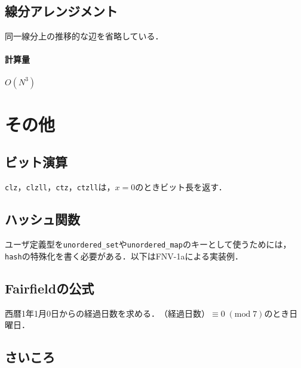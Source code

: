 \documentclass[landscape,twocolumn,9pt]{jsarticle}
\begin{document}
\subsection{線分アレンジメント}
同一線分上の推移的な辺を省略している．
\paragraph{計算量} $O(N^3)$


\section{その他}%
\subsection{ビット演算}
\texttt{clz}，\texttt{clzll}，\texttt{ctz}，\texttt{ctzll}は，$x=0$のときビット長を返す．


\subsection{ハッシュ関数}
ユーザ定義型を\texttt{unordered\_set}や\texttt{unordered\_map}のキーとして使うためには，
\texttt{hash}の特殊化を書く必要がある．以下はFNV-1aによる実装例．


\subsection{Fairfieldの公式}
西暦1年1月0日からの経過日数を求める．$\text{（経過日数）}\equiv 0\; (\mathrm{mod}\; 7)$のとき日曜日．


\subsection{さいころ}

\end{document}
